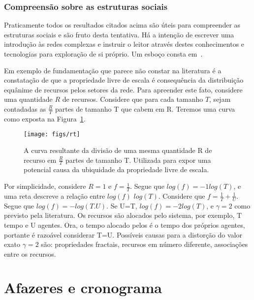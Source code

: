 \documentclass[a4paper,openright,12pt]{report} %
\begin{document}
\subsection{Compreensão sobre as estruturas sociais}\label{sec:com}
Praticamente todos os resultados citados acima
são úteis para compreender as estruturas sociais e são
fruto desta tentativa.
Há a intenção de escrever uma introdução às redes complexas
e instruir o leitor através destes conhecimentos e tecnologias
para exploração de si próprio. Um esboço
consta em~\cite{gradus}.

Em exemplo de fundamentação que parece não 
constar na literatura é a constatação de que
a propriedade livre de escala é consequência da distribuição
equânime de recursos pelos setores da rede. 
Para apreender este fato, considere uma quantidade $R$ de recursos.
Considere que para cada tamanho $T$, sejam contadadas as $\frac{R}{T}$ partes de tamanho T que cabem em R.
Teremos uma curva como exposta na Figura~\ref{fig:1T}.

\begin{figure}[!h]
	\centering
	\texttt{[image: figs/rt]}
	\caption{A curva resultante da divisão de uma mesma quantidade
	R de recurso em $\frac{R}{T}$ partes de tamanho T.
        Utilizada para expor uma potencial causa da ubiquidade da
        propriedade livre de escala.}
	\label{fig:1T}
\end{figure}

Por simplicidade, considere $R=1$ e 
$f=\frac{1}{T}$.
Segue que $log(f)=-1 log(T)$, e uma
reta descreve a relação entre $log(f)$
$log(T)$.
Considere que $f=\frac{1}{T}+\frac{1}{U}$.
Segue que $log(f)=-log(T.U)$. Se U=T, $log(f)=-2 log(T)$, e
$\gamma=2$ como previsto pela literatura.
Os recursos são alocados pelo sistema, por exemplo,
T tempo e U agentes. Ora, o tempo alocado
pelos é o tempo dos próprios agentes,
portante é razoável considerar T=U. 
Possíveis causas para a distorção do valor exato $\gamma=2$
são: propriedades fractais, recursos em número diferente, associações entre os recursos. 

\chapter{Afazeres e cronograma}
\end{document}
